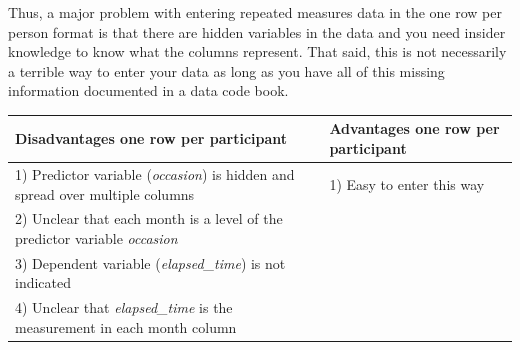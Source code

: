 \documentclass[
]{krantz}
\begin{document}
Thus, a major problem with entering repeated measures data in the one row per person format is that there are hidden variables in the data and you need insider knowledge to know what the columns represent. That said, this is not necessarily a terrible way to enter your data as long as you have all of this missing information documented in a data code book.

\begin{longtable}[]{@{}ll@{}}
\toprule
\begin{minipage}[b]{0.52\columnwidth}\raggedright
Disadvantages one row per participant\strut
\end{minipage} & \begin{minipage}[b]{0.42\columnwidth}\raggedright
Advantages one row per participant\strut
\end{minipage}\tabularnewline
\midrule
\endhead
\begin{minipage}[t]{0.52\columnwidth}\raggedright
1) Predictor variable (\emph{occasion}) is hidden and spread over multiple columns\strut
\end{minipage} & \begin{minipage}[t]{0.42\columnwidth}\raggedright
1) Easy to enter this way\strut
\end{minipage}\tabularnewline
\begin{minipage}[t]{0.52\columnwidth}\raggedright
2) Unclear that each month is a level of the predictor variable \emph{occasion}\strut
\end{minipage} & \begin{minipage}[t]{0.42\columnwidth}\raggedright
\strut
\end{minipage}\tabularnewline
\begin{minipage}[t]{0.52\columnwidth}\raggedright
3) Dependent variable (\emph{elapsed\_time}) is not indicated\strut
\end{minipage} & \begin{minipage}[t]{0.42\columnwidth}\raggedright
\strut
\end{minipage}\tabularnewline
\begin{minipage}[t]{0.52\columnwidth}\raggedright
4) Unclear that \emph{elapsed\_time} is the measurement in each month column\strut
\end{minipage} & \begin{minipage}[t]{0.42\columnwidth}\raggedright
\strut
\end{minipage}\tabularnewline
\bottomrule
\end{longtable}
\end{document}
